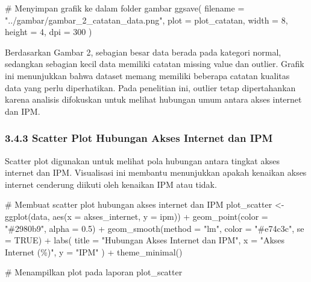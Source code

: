 \documentclass[
  indonesian,
  letterpaper,
  DIV=11,
  numbers=noendperiod]{scrartcl}
\newenvironment{Shaded}{\begin{snugshade}}{\end{snugshade}}
\newcommand{\AttributeTok}[1]{\textcolor[rgb]{0.40,0.45,0.13}{#1}}
\newcommand{\CommentTok}[1]{\textcolor[rgb]{0.37,0.37,0.37}{#1}}
\newcommand{\ConstantTok}[1]{\textcolor[rgb]{0.56,0.35,0.01}{#1}}
\newcommand{\DecValTok}[1]{\textcolor[rgb]{0.68,0.00,0.00}{#1}}
\newcommand{\FloatTok}[1]{\textcolor[rgb]{0.68,0.00,0.00}{#1}}
\newcommand{\FunctionTok}[1]{\textcolor[rgb]{0.28,0.35,0.67}{#1}}
\newcommand{\NormalTok}[1]{\textcolor[rgb]{0.00,0.23,0.31}{#1}}
\newcommand{\OtherTok}[1]{\textcolor[rgb]{0.00,0.23,0.31}{#1}}
\newcommand{\SpecialCharTok}[1]{\textcolor[rgb]{0.37,0.37,0.37}{#1}}
\newcommand{\StringTok}[1]{\textcolor[rgb]{0.13,0.47,0.30}{#1}}
\begin{document}
\begin{Shaded}
\begin{Highlighting}[]
\CommentTok{\# Menyimpan grafik ke dalam folder gambar}
\FunctionTok{ggsave}\NormalTok{(}
  \AttributeTok{filename =} \StringTok{"../gambar/gambar\_2\_catatan\_data.png"}\NormalTok{,}
  \AttributeTok{plot =}\NormalTok{ plot\_catatan,}
  \AttributeTok{width =} \DecValTok{8}\NormalTok{,}
  \AttributeTok{height =} \DecValTok{4}\NormalTok{,}
  \AttributeTok{dpi =} \DecValTok{300}
\NormalTok{)}
\end{Highlighting}
\end{Shaded}

Berdasarkan Gambar 2, sebagian besar data berada pada kategori normal,
sedangkan sebagian kecil data memiliki catatan missing value dan
outlier. Grafik ini menunjukkan bahwa dataset memang memiliki beberapa
catatan kualitas data yang perlu diperhatikan. Pada penelitian ini,
outlier tetap dipertahankan karena analisis difokuskan untuk melihat
hubungan umum antara akses internet dan IPM.

\subsubsection{3.4.3 Scatter Plot Hubungan Akses Internet dan
IPM}\label{scatter-plot-hubungan-akses-internet-dan-ipm}

Scatter plot digunakan untuk melihat pola hubungan antara tingkat akses
internet dan IPM. Visualisasi ini membantu menunjukkan apakah kenaikan
akses internet cenderung diikuti oleh kenaikan IPM atau tidak.

\begin{Shaded}
\begin{Highlighting}[]
\CommentTok{\# Membuat scatter plot hubungan akses internet dan IPM}
\NormalTok{plot\_scatter }\OtherTok{\textless{}{-}} \FunctionTok{ggplot}\NormalTok{(data, }\FunctionTok{aes}\NormalTok{(}\AttributeTok{x =}\NormalTok{ akses\_internet, }\AttributeTok{y =}\NormalTok{ ipm)) }\SpecialCharTok{+}
  \FunctionTok{geom\_point}\NormalTok{(}\AttributeTok{color =} \StringTok{"\#2980b9"}\NormalTok{, }\AttributeTok{alpha =} \FloatTok{0.5}\NormalTok{) }\SpecialCharTok{+}
  \FunctionTok{geom\_smooth}\NormalTok{(}\AttributeTok{method =} \StringTok{"lm"}\NormalTok{, }\AttributeTok{color =} \StringTok{"\#e74c3c"}\NormalTok{, }\AttributeTok{se =} \ConstantTok{TRUE}\NormalTok{) }\SpecialCharTok{+}
  \FunctionTok{labs}\NormalTok{(}
    \AttributeTok{title =} \StringTok{"Hubungan Akses Internet dan IPM"}\NormalTok{,}
    \AttributeTok{x =} \StringTok{"Akses Internet (\%)"}\NormalTok{,}
    \AttributeTok{y =} \StringTok{"IPM"}
\NormalTok{  ) }\SpecialCharTok{+}
  \FunctionTok{theme\_minimal}\NormalTok{()}

\CommentTok{\# Menampilkan plot pada laporan}
\NormalTok{plot\_scatter}
\end{Highlighting}
\end{Shaded}
\end{document}
